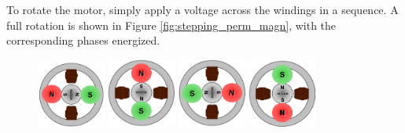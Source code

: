 \newpage
To rotate the motor, simply apply a voltage across the windings in 
a sequence. A full rotation is 
shown in Figure \ref{fig:stepping_perm_magn}, with the 
corresponding phases energized.

\begin{figure}[htp]
    \begin{center}
    \includegraphics[width=0.2\textwidth]{figures/move/motor9.png}    
    \hfill
    \includegraphics[width=0.2\textwidth]{figures/move/motor10.png}
    \hfill
    \includegraphics[width=0.2\textwidth]{figures/move/motor11.png}
  	\hfill
  	\includegraphics[width=0.2\textwidth]{figures/move/motor12.png}
    \end{center}
\end{figure}
\vspace{-10mm}

